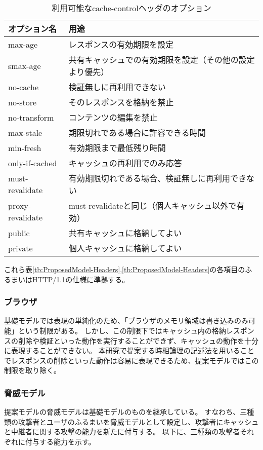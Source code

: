 \documentclass[journal]{IEEEtran}
\begin{document}
\begin{table}[htb]
\centering
\caption{利用可能なcache-controlヘッダのオプション}
\label{tb:CacheControlOption}
\begin{tabular}{ll}
\hline
オプション名 & 用途 \\
\hline
max-age & レスポンスの有効期限を設定 \\
smax-age & 共有キャッシュでの有効期限を設定（その他の設定より優先） \\
no-cache & 検証無しに再利用できない \\
no-store & そのレスポンスを格納を禁止 \\
no-transform & コンテンツの編集を禁止 \\
max-stale & 期限切れである場合に許容できる時間 \\
min-fresh & 有効期限まで最低残り時間 \\
only-if-cached & キャッシュの再利用でのみ応答 \\
must-revalidate & 有効期限切れである場合、検証無しに再利用できない \\
proxy-revalidate & must-revalidateと同じ（個人キャッシュ以外で有効） \\
public & 共有キャッシュに格納してよい \\
private & 個人キャッシュに格納してよい \\
\hline
\end{tabular}
\end{table}

これら表\ref{tb:ProposedModel-Headers},\ref{tb:ProposedModel-Headers}の各項目のふるまいはHTTP/1.1の仕様に準拠する。

\subsubsection{ブラウザ}
基礎モデルでは表現の単純化のため、「ブラウザのメモリ領域は書き込みのみ可能」という制限がある。
しかし、この制限下ではキャッシュ内の格納レスポンスの削除や検証といった動作を実行することができず、キャッシュの動作を十分に表現することができない。
本研究で提案する時相論理の記述法を用いることでレスポンスの削除といった動作は容易に表現できるため、提案モデルではこの制限を取り除く。

\subsubsection{脅威モデル}
提案モデルの脅威モデルは基礎モデルのものを継承している。
すなわち、三種類の攻撃者とユーザのふるまいを脅威モデルとして設定し、攻撃者にキャッシュと中継者に関する攻撃の能力を新たに付与する。
以下に、三種類の攻撃者それぞれに付与する能力を示す。
\end{document}
